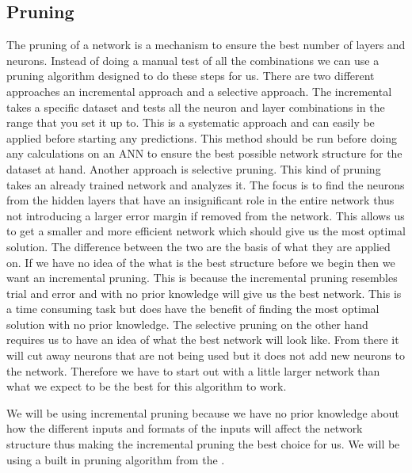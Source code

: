\subsection{Pruning}
\label{sec:pruning}
The pruning of a network is a mechanism to ensure the best number of layers and neurons. Instead of doing a manual test of all the combinations we can use a pruning algorithm designed to do these steps for us. There are two different approaches an incremental approach and a selective approach\cite{stepniewski1997pruning}. The incremental  takes a specific dataset and tests all the neuron and layer combinations in the range that you set it up to. This is a systematic approach and can easily be applied before starting any predictions. This method should be run before doing any calculations on an ANN to ensure the best possible network structure for the dataset at hand. Another approach is selective pruning. This kind of pruning takes an already trained network and analyzes it. The focus is to find the neurons from the hidden layers that have an insignificant role in the entire network thus not introducing a larger error margin if removed from the network. This allows us to get a smaller and more efficient network which should give us the most optimal solution. The difference between the two are the basis of what they are applied on. If we have no idea of the what is the best structure before we begin then we want an incremental pruning. This is because the incremental pruning resembles trial and error and with no prior knowledge will give us the best network. This is a time consuming task but does have the benefit of finding the most optimal solution with no prior knowledge. The selective pruning on the other hand requires us to have an idea of what the best network will look like. From there it will cut away neurons that are not being used but it does not add new neurons to the network. Therefore we have to start out with a little larger network than what we expect to be the best for this algorithm to work.

We will be using incremental pruning because we have no prior knowledge about how the different inputs and formats of the inputs will affect the network structure thus making the incremental pruning the best choice for us. We will be using a built in pruning algorithm from the .